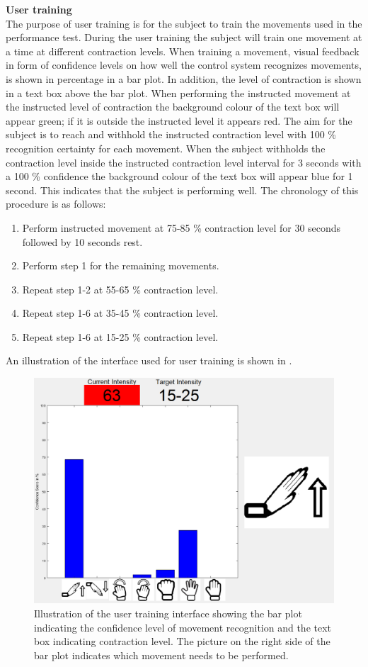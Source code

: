 \textbf{User training} \\ %
The purpose of user training is for the subject to train the movements used in the performance test. During the user training the subject will train one movement at a time at different contraction levels. When training a movement, visual feedback in form of confidence levels on how well the control system recognizes movements, is shown in percentage in a bar plot. In addition, the level of contraction is shown in a text box above the bar plot. When performing the instructed movement at the instructed level of contraction the background colour of the text box will appear green; if it is outside the instructed level it appears red. The aim for the subject is to reach and withhold the instructed contraction level with 100 \% recognition certainty for each movement. When the subject withholds the contraction level inside the instructed contraction level interval for 3 seconds with a 100 \% confidence the background colour of the text box will appear blue for 1 second. This indicates that the subject is performing well. The chronology of this procedure is as follows:

\begin{enumerate}
	\item Perform instructed movement at 75-85 \% contraction level for 30 seconds followed by 10 seconds rest.
	\item Perform step 1 for the remaining movements.
	\item Repeat step 1-2 at 55-65 \% contraction level.
	\item Repeat step 1-6 at 35-45 \% contraction level.
	\item Repeat step 1-6 at 15-25 \% contraction level.
\end{enumerate} 

An illustration of the interface used for user training is shown in .

\begin{figure}[H]                 
	\includegraphics[width=.6\textwidth]{figures/xBackground/usertraintestGUI}  
	\caption{Illustration of the user training interface showing the bar plot indicating the confidence level of movement recognition and the text box indicating contraction level. The picture on the right side of the bar plot indicates which movement needs to be performed.}
	\label{fig:usertraintestGUI} 
\end{figure}

